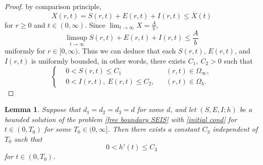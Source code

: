 \documentclass[11pt]{amsart}
\numberwithin{equation}{section}
\theoremstyle{plain}
\newtheorem{lemma}[theorem]{Lemma}
\theoremstyle{definition}
\begin{document}
\begin{proof}
		by comparison principle,
		\begin{equation*}
			X(r,t)=S(r,t)+E(r,t)+I(r,t) \leq \overline{X}(t)
		\end{equation*}
		for $r\geq 0$ and $t \in (0,\infty)$.
		Since $\displaystyle \lim_{t\to \infty}X=\frac{A}{b}$,
		\begin{equation*}
			\limsup_{t \to \infty}S(r,t)+E(r,t)+I(r,t) \leq \frac{A}{b}
		\end{equation*}
		uniformly for $r\in [0,\infty)$.
		Thus we can deduce that each $S(r,t)$, $E(r,t)$, and $I(r,t)$ is uniformly bounded, in other words, there exists $C_1,\ C_2>0$ such that
		\begin{equation*}
			\left \{ \begin{aligned}
				&0<S(r,t)\leq C_1 \qquad &&(r,t) \in \Omega_\infty,\\
				&0<I(r,t),\ E(r,t)\leq C_2, &&(r,t) \in \Omega_h.
			\end{aligned} \right.
		\end{equation*}
	\end{proof}
	
	\begin{lemma} \label{uniform h'}
		Suppose that $d_1=d_2=d_3=d$ for some $d$, and let $(S,E,I;h)$ be a bounded solution of the problem \cref{free boundary SEIS} with \cref{initial cond} for $t \in (0,T_0)$ for some $T_0 \in (0,\infty]$. Then there exists a constant $C_3$ independent of $T_0$ such that
		\begin{equation*}
			0<h'(t)\leq C_3
		\end{equation*}
		for $t\in (0,T_0)$.
	\end{lemma}
	
\end{document}
